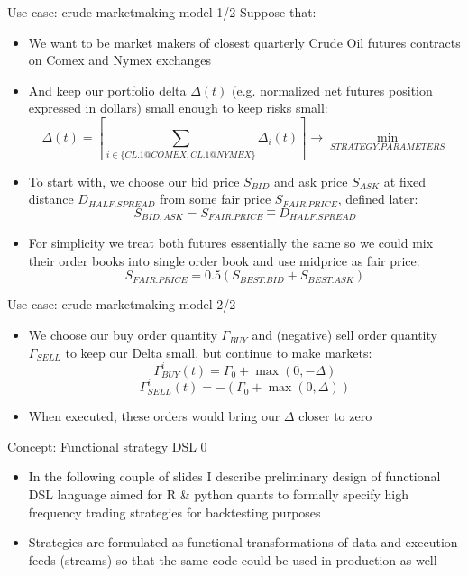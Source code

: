 \documentclass[10pt]{beamer}
\begin{document}
\begin{frame}{Use case: crude marketmaking model 1/2}
Suppose that:
\begin{itemize}
	\item We want to be market makers of closest quarterly Crude Oil futures contracts on Comex and Nymex exchanges
	\item And keep our portfolio delta $\Delta(t)$ (e.g. normalized net futures position expressed in dollars) small enough to keep risks small:
	$$
	\Delta(t)=[\sum_{i\in \{CL.1@COMEX,CL.1@NYMEX\}} \Delta_{i}(t) ] \rightarrow \min_{STRATEGY.PARAMETERS}
	$$
	\item To start with, we choose our bid price $S_{BID}$ and ask price $S_{ASK}$ at fixed distance $D_{HALF.SPREAD}$ from some fair price $S_{FAIR.PRICE}$, defined later:
	$$
	S_{BID,ASK} = S_{FAIR.PRICE}  \mp D_{HALF.SPREAD} 
	$$
	\item For simplicity we treat both futures essentially the same so we could mix their order books into single order book and use midprice as fair price:
	$$
	S_{FAIR.PRICE} = 0.5(S_{BEST.BID}+S_{BEST.ASK})
	$$
\end{itemize}
\end{frame}

\begin{frame}{Use case: crude marketmaking model 2/2}
\begin{itemize}
\item We choose our buy order quantity  $\Gamma_{BUY}$ and (negative) sell order quantity $\Gamma_{SELL}$ to keep our Delta small, but continue to  make markets:
$$\Gamma^i_{BUY}(t)=\Gamma_0+\max(0,-\Delta) $$
$$\Gamma^i_{SELL}(t)=-(\Gamma_0+\max(0,\Delta)) $$
\item When executed, these orders would bring our $\Delta$ closer to zero
\end{itemize}
\end{frame}

\begin{frame}[fragile]{Concept: Functional strategy DSL 0}
\begin{itemize}
\item In the following couple of slides I describe preliminary design of functional DSL language aimed for R \& python quants to formally specify
high frequency trading strategies for backtesting purposes
\item Strategies are formulated as functional transformations of data and execution feeds (streams) so that the same code could be used in production as well
\end{itemize}
\end{frame}
\end{document}
